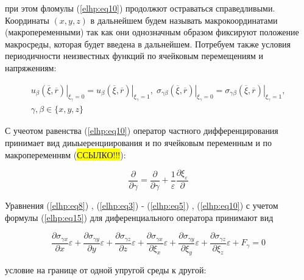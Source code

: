при этом фломулы 
(\ref{elhp:eq10})
продолжют остраваться справедливыми. Координаты 
$ \left( x,y,z \right) $ 
в дальнейшем будем называть макрокоординатами (макропеременными)
так как они однозначным образом фиксируют положение макросреды, которая будет введена в дальнейшем. Потребуем также условия периодичности неизвестных
функций по ячейковым перемещениям и напряжениям:

\begin{equation}
    \label{elhp:eq14}
    \begin{gathered}
    u_{\beta} \left. \left( \overline{\xi}, \overline{r} \right)  \right|_{\xi_{\gamma}=0} =
    u_{\beta} \left. \left( \overline{\xi}, \overline{r} \right)  \right|_{\xi_{\gamma}=1} 
    ,\;
    \sigma_{\gamma\beta} \left. \left( \overline{\xi}, \overline{r} \right)  \right|_{\xi_{\gamma}=0} =
    \sigma_{\gamma\beta} \left. \left( \overline{\xi}, \overline{r} \right)  \right|_{\xi_{\gamma}=1} 
    ,
    \\
    \gamma,\beta \in \{x,y,z\} 
    \end{gathered}
\end{equation}

С учеотом равенства 
(\ref{elhp:eq10})
оператор частного дифференцирования принимает вид диыыеренциирования и по ячейковым переменным и по макропеременнвм (\colorbox{yellow}{ССЫЛКО!!!}):

\begin{equation}
    \label{elhp:eq15}
    \frac{\partial }{\partial \gamma} = \frac{\partial }{\partial \gamma} + \frac{1}{\varepsilon} \frac{\partial \xi_{\varepsilon}}{\partial } 
\end{equation}

Уравнения 
(\ref{elhp:eq8})
, 
(\ref{elhp:eq3})
-
(\ref{elhp:eq5})
, 
(\ref{elhp:eq10})
с учетом формулы 
(\ref{elhp:eq15})
для диференциального оператора принимают вид

\begin{equation}
    \label{elhp:eq16}
    \frac{\partial \sigma_{\gamma x}}{\partial x} \varepsilon + 
    \frac{\partial \sigma_{\gamma y}}{\partial y} \varepsilon + 
    \frac{\partial \sigma_{\gamma z}}{\partial z} \varepsilon + 
    \frac{\partial \sigma_{\gamma x}}{\partial \xi_x} \varepsilon + 
    \frac{\partial \sigma_{\gamma y}}{\partial \xi_y} \varepsilon + 
    \frac{\partial \sigma_{\gamma z}}{\partial \xi_z} \varepsilon + 
    F_{\gamma} = 0
\end{equation}

условие на границе от одной упругой среды к другой:

